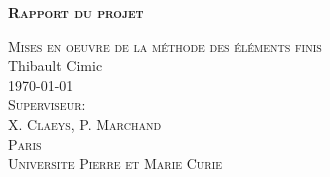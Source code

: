 \begin{titlepage}
	\begin{center}
		\vspace*{2.5cm}
		\textbf{
		\huge{
		\textsc{Rapport du projet}\\}}

		\vspace{5cm}

		\LARGE{
		\textsc{Mises en oeuvre de la méthode des éléments finis}\\[0.5\baselineskip]
		Thibault Cimic\\

		\vspace{5cm}
		\textsc{\today}\\ 

		\vspace{1cm}
		\textsc{Superviseur:\\
		X. Claeys, P. Marchand}\\

		\vspace{1cm}
		\textsc{Paris\\
		Universite Pierre et Marie Curie}\\}

		\end{center}

\end{titlepage}